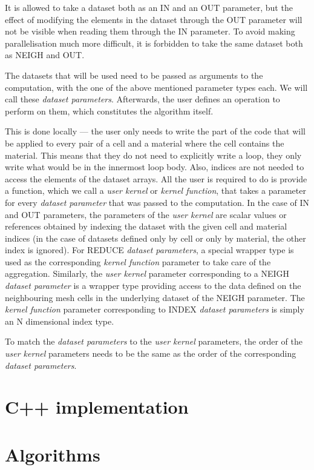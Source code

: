 \documentclass[fontsize=11pt, appendixprefix=true]{scrreprt}
\begin{document}
It is allowed to take a dataset both as an IN and an OUT parameter, but the
effect of modifying the elements in the dataset through the OUT parameter will
not be visible when reading them through the IN parameter. To avoid making
parallelisation much more difficult, it is forbidden to take the same dataset
both as NEIGH and OUT.

The datasets that will be used need to be passed as arguments to the
computation, with the one of the above mentioned parameter types each. We will
call these \textit{dataset parameters}. Afterwards, the user defines an
operation to perform on them, which constitutes the algorithm itself.

This is done locally --- the user only needs to write the part of the code that
will be applied to every pair of a cell and a material where the cell contains
the material. This means that they do not need to explicitly write a loop, they
only write what would be in the innermost loop body. Also, indices are not
needed to access the elements of the dataset arrays. All the user is required to
do is provide a function, which we call a \textit{user kernel} or \textit{kernel
  function}, that takes a parameter for every \textit{dataset parameter} that
was passed to the computation. In the case of IN and OUT parameters, the
parameters of the \textit{user kernel} are scalar values or references obtained
by indexing the dataset with the given cell and material indices (in the case of
datasets defined only by cell or only by material, the other index is
ignored). For REDUCE \textit{dataset parameters}, a special wrapper type is used
as the corresponding \textit{kernel function} parameter to take care of the
aggregation. Similarly, the \textit{user kernel} parameter corresponding to a
NEIGH \textit{dataset parameter} is a wrapper type providing access to the data
defined on the neighbouring mesh cells in the underlying dataset of the NEIGH
parameter. The \textit{kernel function} parameter corresponding to INDEX
\textit{dataset parameters} is simply an N dimensional index type.

To match the \textit{dataset parameters} to the \textit{user kernel} parameters,
the order of the \textit{user kernel} parameters needs to be the same as the
order of the corresponding \textit{dataset parameters}.


\section{C++ implementation}
\section{Algorithms}
\end{document}
